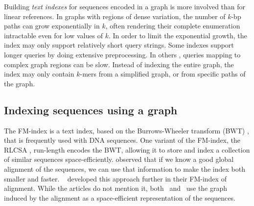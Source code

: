 Building \emph{text indexes} for sequences encoded in a graph is more involved than for linear references.
In graphs with regions of dense variation, the number of $k$-bp paths can grow exponentially in $k$, often rendering their complete enumeration intractable even for low values of $k$.
In order to limit the exponential growth, the index may only support relatively short query strings.
Some indexes \cite{Siren_2014} support longer queries by doing extensive preprocessing.
In others \cite{Thachuk_2013,Huang_2013,Maciuca_2016}, queries mapping to complex graph regions can be slow.
Instead of indexing the entire graph, the index may only contain $k$-mers from a simplified graph, or from specific paths of the graph.

\subsection{Indexing sequences using a graph}

The FM-index \cite{Ferragina_2005} is a text index, based on the Burrows-Wheeler transform (BWT) \cite{Burrows_1994}, that is frequently used with DNA sequences.
One variant of the FM-index, the RLCSA \cite{Maekinen_2010}, run-length encodes the BWT, allowing it to store and index a collection of similar sequences space-efficiently.
\citeauthor{Huang_2010} \cite{Huang_2010} observed that if we know a good global alignment of the sequences, we can use that information to make the index both smaller and faster.
\citeauthor{Na_2016}\ \cite{Na_2016,Na_2018} developed this approach further in their FM-index of alignment.
While the articles do not mention it, both \citeauthor{Huang_2010}\ and \citeauthor{Na_2016}\ use the graph induced by the alignment as a space-efficient representation of the sequences.

